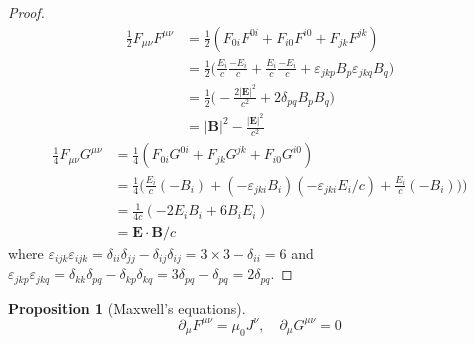 \documentclass[a4paper]{article}
\theoremstyle{new}
\newtheorem{prop}{Proposition}[section]
\begin{document}
\begin{proof}
\begin{align}
\frac{1}{2}F_{\mu\nu}F^{\mu\nu}&=\frac{1}{2}(F_{0i}F^{0i}+F_{i0}F^{i0}+F_{jk}F^{jk})\nonumber\\&=\frac{1}{2}\bigg(\frac{E_i}{c}\frac{-E_i}{c}+\frac{E_i}{c}\frac{-E_i}{c}+\varepsilon_{jkp}B_p\varepsilon_{jkq}B_q\bigg)\nonumber\\&=\frac{1}{2}\bigg(-\frac{2|\mathbf{E}|^2}{c^2}+2\delta_{pq}B_pB_q\bigg)\nonumber\\&=|\mathbf{B}|^2-\frac{|\mathbf{E}|^2}{c^2}\nonumber
\end{align}
\begin{align}
    \frac{1}{4}F_{\mu\nu}G^{\mu\nu}&=\frac{1}{4}(F_{0i}G^{0i}+F_{jk}G^{jk}+F_{i0}G^{i0})\nonumber\\&=\frac{1}{4}\bigg(\frac{E_i}{c}(-B_i)+(-\varepsilon_{jki}B_i)(-\varepsilon_{jki}E_i/c)+\frac{E_i}{c}(-B_i))\bigg)\nonumber\\&=\frac{1}{4c}(-2E_iB_i+6B_iE_i)\nonumber\\&=\mathbf{E}\cdot\mathbf{B}/c\nonumber
\end{align}
where $\varepsilon_{ijk}\varepsilon_{ijk}=\delta_{ii}\delta_{jj}-\delta_{ij}\delta_{ij}=3\times 3-\delta_{ii}=6$ and $\varepsilon_{jkp}\varepsilon_{jkq}=\delta_{kk}\delta_{pq}-\delta_{kp}\delta_{kq}=3\delta_{pq}-\delta_{pq}=2\delta_{pq}$.
\end{proof}
\newpage
\begin{prop}[Maxwell's equations]
$$\partial_\mu F^{\mu\nu}=\mu_0J^\nu,\quad\partial_\mu G^{\mu\nu}=0$$
\end{prop}
\end{document}

